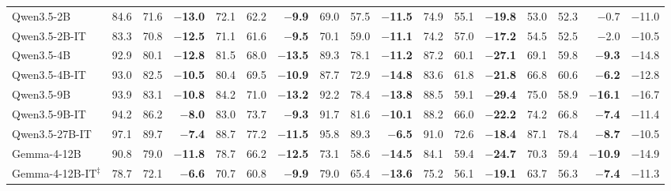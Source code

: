 \begin{table}[ht!]
{\begin{tabular}{@{}l rrr rrr rrr rrr rrr r@{}}
Qwen3.5-2B                   & 84.6 & 71.6 & \textbf{{\boldmath$-$}13.0} & 72.1 & 62.2 & \textbf{{\boldmath$-$}9.9} & 69.0 & 57.5 & \textbf{{\boldmath$-$}11.5} & 74.9 & 55.1 & \textbf{{\boldmath$-$}19.8} & 53.0 & 52.3 & $-$0.7 & $-$11.0 \\
Qwen3.5-2B-IT                & 83.3 & 70.8 & \textbf{{\boldmath$-$}12.5} & 71.1 & 61.6 & \textbf{{\boldmath$-$}9.5} & 70.1 & 59.0 & \textbf{{\boldmath$-$}11.1} & 74.2 & 57.0 & \textbf{{\boldmath$-$}17.2} & 54.5 & 52.5 & $-$2.0 & $-$10.5 \\
Qwen3.5-4B                   & 92.9 & 80.1 & \textbf{{\boldmath$-$}12.8} & 81.5 & 68.0 & \textbf{{\boldmath$-$}13.5} & 89.3 & 78.1 & \textbf{{\boldmath$-$}11.2} & 87.2 & 60.1 & \textbf{{\boldmath$-$}27.1} & 69.1 & 59.8 & \textbf{{\boldmath$-$}9.3} & $-$14.8 \\
Qwen3.5-4B-IT                & 93.0 & 82.5 & \textbf{{\boldmath$-$}10.5} & 80.4 & 69.5 & \textbf{{\boldmath$-$}10.9} & 87.7 & 72.9 & \textbf{{\boldmath$-$}14.8} & 83.6 & 61.8 & \textbf{{\boldmath$-$}21.8} & 66.8 & 60.6 & \textbf{{\boldmath$-$}6.2} & $-$12.8 \\
Qwen3.5-9B                   & 93.9 & 83.1 & \textbf{{\boldmath$-$}10.8} & 84.2 & 71.0 & \textbf{{\boldmath$-$}13.2} & 92.2 & 78.4 & \textbf{{\boldmath$-$}13.8} & 88.5 & 59.1 & \textbf{{\boldmath$-$}29.4} & 75.0 & 58.9 & \textbf{{\boldmath$-$}16.1} & $-$16.7 \\
Qwen3.5-9B-IT                & 94.2 & 86.2 & \textbf{{\boldmath$-$}8.0} & 83.0 & 73.7 & \textbf{{\boldmath$-$}9.3} & 91.7 & 81.6 & \textbf{{\boldmath$-$}10.1} & 88.2 & 66.0 & \textbf{{\boldmath$-$}22.2} & 74.2 & 66.8 & \textbf{{\boldmath$-$}7.4} & $-$11.4 \\
Qwen3.5-27B-IT               & 97.1 & 89.7 & \textbf{{\boldmath$-$}7.4} & 88.7 & 77.2 & \textbf{{\boldmath$-$}11.5} & 95.8 & 89.3 & \textbf{{\boldmath$-$}6.5} & 91.0 & 72.6 & \textbf{{\boldmath$-$}18.4} & 87.1 & 78.4 & \textbf{{\boldmath$-$}8.7} & $-$10.5 \\
\addlinespace
Gemma-4-12B                  & 90.8 & 79.0 & \textbf{{\boldmath$-$}11.8} & 78.7 & 66.2 & \textbf{{\boldmath$-$}12.5} & 73.1 & 58.6 & \textbf{{\boldmath$-$}14.5} & 84.1 & 59.4 & \textbf{{\boldmath$-$}24.7} & 70.3 & 59.4 & \textbf{{\boldmath$-$}10.9} & $-$14.9 \\
Gemma-4-12B-IT$^{\ddagger}$  & 78.7 & 72.1 & \textbf{{\boldmath$-$}6.6} & 70.7 & 60.8 & \textbf{{\boldmath$-$}9.9} & 79.0 & 65.4 & \textbf{{\boldmath$-$}13.6} & 75.2 & 56.1 & \textbf{{\boldmath$-$}19.1} & 63.7 & 56.3 & \textbf{{\boldmath$-$}7.4} & $-$11.3 \\

\end{tabular}}
\end{table}
